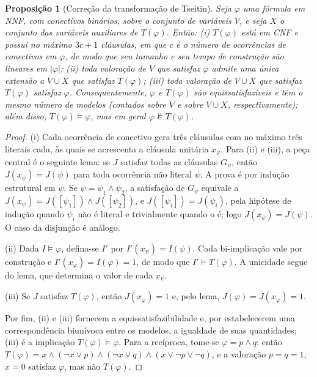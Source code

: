 \documentclass[12pt,a4paper,oneside]{report}
\theoremstyle{tituloplain}
\newtheorem{proposicao}[teorema]{Proposição}
\theoremstyle{titulodef}
\begin{document}
\begin{proposicao}[Correção da transformação de Tseitin]\label{prop:tseitin}
Seja $\varphi$ uma fórmula em NNF, com conectivos binários, sobre o conjunto de variáveis $V$, e seja $X$ o conjunto das variáveis auxiliares de $T(\varphi)$. Então: (i) $T(\varphi)$ está em CNF e possui no máximo $3c+1$ cláusulas, em que $c$ é o número de ocorrências de conectivos em $\varphi$, de modo que seu tamanho e seu tempo de construção são lineares em $|\varphi|$; (ii) toda valoração de $V$ que satisfaz $\varphi$ admite uma única extensão a $V\cup X$ que satisfaz $T(\varphi)$; (iii) toda valoração de $V\cup X$ que satisfaz $T(\varphi)$ satisfaz $\varphi$. Consequentemente, $\varphi$ e $T(\varphi)$ são equissatisfazíveis e têm o mesmo número de modelos (contados sobre $V$ e sobre $V\cup X$, respectivamente); além disso, $T(\varphi)\models\varphi$, mas em geral $\varphi\not\models T(\varphi)$.
\end{proposicao}
\begin{proof}
(i) Cada ocorrência de conectivo gera três cláusulas com no máximo três literais cada, às quais se acrescenta a cláusula unitária $x_\varphi$. Para (ii) e (iii), a peça central é o seguinte lema: se $J$ satisfaz todas as cláusulas $G_\psi$, então $J(x_\psi)=J(\psi)$ para toda ocorrência não literal $\psi$. A prova é por indução estrutural em $\psi$. Se $\psi=\psi_1\wedge\psi_2$, a satisfação de $G_\psi$ equivale a $J(x_\psi)=J([\psi_1])\wedge J([\psi_2])$, e $J([\psi_i])=J(\psi_i)$, pela hipótese de indução quando $\psi_i$ não é literal e trivialmente quando o é; logo $J(x_\psi)=J(\psi)$. O caso da disjunção é análogo.
 
(ii) Dada $I\models\varphi$, defina-se $I'$ por $I'(x_\psi)=I(\psi)$. Cada bi-implicação vale por construção e $I'(x_\varphi)=I(\varphi)=1$, de modo que $I'\models T(\varphi)$. A unicidade segue do lema, que determina o valor de cada $x_\psi$.
 
(iii) Se $J$ satisfaz $T(\varphi)$, então $J(x_\varphi)=1$ e, pelo lema, $J(\varphi)=J(x_\varphi)=1$.
 
Por fim, (ii) e (iii) fornecem a equissatisfazibilidade e, por estabelecerem uma correspondência biunívoca entre os modelos, a igualdade de suas quantidades; (iii) é a implicação $T(\varphi)\models\varphi$. Para a recíproca, tome-se $\varphi=p\wedge q$: então $T(\varphi)=x\wedge(\neg x\vee p)\wedge(\neg x\vee q)\wedge(x\vee\neg p\vee\neg q)$, e a valoração $p=q=1$, $x=0$ satisfaz $\varphi$, mas não $T(\varphi)$.
\end{proof}
 
\end{document}

